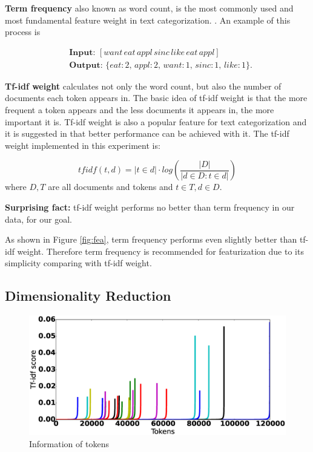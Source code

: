 \documentclass{sig-alternate-05-2015}
\begin{document}
\textbf{Term frequency }also known as word count, is the most commonly used and most fundamental feature weight in text categorization. \cite{manning1999foundations}. An example of this process is 

\begin{equation*}
\begin{aligned}
    &\textbf{Input: }[want\, eat\, appl\, sinc\, like\, eat\, appl]\\
    &\textbf{Output: }\{eat: 2,\, appl: 2,\, want: 1,\, sinc: 1,\,like: 1\}.
\end{aligned}
\end{equation*}

\textbf{Tf-idf weight }calculates not only the word count, but also the number of documents each token appears in. The basic idea of tf-idf weight is that the more frequent a token appears and the less documents it appears in, the more important it is. Tf-idf weight is also a popular feature for text categorization\cite{caropreso2001learner} and it is suggested in \cite{moharanatag} that better performance can be achieved with it. The tf-idf weight implemented in this experiment is:

\[\mathit{tfidf}(t, d) = |t  \in d| \cdot  log\left(\frac{|D|}{|d\in D: t\in d|}\right)\]
where $D,T$ are all documents and tokens and $t\in T,d\in D$.


\textbf{Surprising fact:} tf-idf weight performs no better than term frequency in our data, for our goal. 

As shown in Figure \ref{fig:fea}, term frequency performs even slightly better than tf-idf weight. Therefore term frequency is recommended for featurization due to its simplicity comparing with tf-idf weight.

\subsection{Dimensionality Reduction}

\begin{figure}[ht]
  \includegraphics[width=\linewidth]{./fig/tokens.eps}
  \caption{Information of tokens}
  \label{fig:tokens}
\end{figure}
\end{document}
